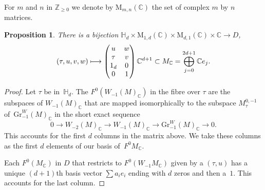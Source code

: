\documentclass[11pt]{article}
\providecommand{\C}{}
\def\mto{\mathchoice{\longmapsto}{\mapsto}{\mapsto}{\mapsto}}
\theoremstyle{plain}
\newtheorem{Proposition}[subsection]{Proposition}
\theoremstyle{definition}
\numberwithin{equation}{subsection}
\renewcommand{\C}{\mathbb C}
\newcommand{\Z}{\mathbb Z}
\renewcommand{\H}{\mathbb H}
\newcommand{\Gr}{\mathrm{Gr}}
\newcommand{\rmM}{\mathrm{M}}
\begin{document}
For $m$ and $n$ in $\Z_{\geq0}$ we denote by $\rmM_{m,n}(\C)$ the set
of complex $m$ by $n$ matrices.

\begin{Proposition}\label{prop:paramD}
There is a bijection
$\H_d\times \rmM_{1,d}(\C) \times \rmM_{d,1}(\C)\times \C \to D$,
\[
(\tau,u,v,w)\mto
\begin{pmatrix}
u & w\\ \tau & v \\ 1_d & 0\\ 0 & 1
\end{pmatrix}
\C^{d+1} \subset M_\C=\bigoplus_{j=0}^{2d+1}\C e_j.
\]
\end{Proposition}
\begin{proof}
Let $\tau$ be in~$\H_d$. The $F^0(W_{-1}(M)_\C)$ in the fibre over
$\tau$ are the subspaces of $W_{-1}(M)_\C$
that are mapped isomorphically to the subspace $M^{0,-1}_\tau$
of~$\Gr^W_{-1}(M)_\C$ in the short exact sequence
\[
0 \to W_{-2}(M)_\C \to W_{-1}(M)_\C \to \Gr^W_{-1}(M)_\C \to 0.
\]
This accounts for the first $d$ columns in the matrix above. We take these
columns as the first $d$ elements of our basis of~$F^0M_\C$.

Each $F^0(M_\C)$ in $D$ that restricts to $F^0(W_{-1}M_\C)$ given by
a $(\tau,u)$ has a unique $(d{+}1)$th basis vector
$\sum a_i e_i$ ending with $d$ zeros and then a~$1$. This accounts for
the last column.
\end{proof}
\end{document}
